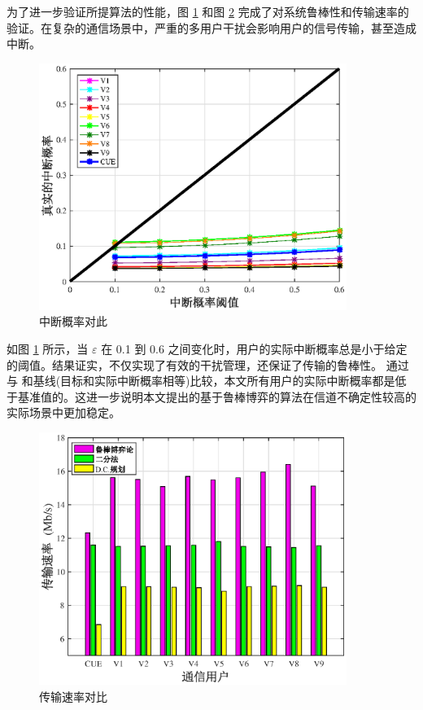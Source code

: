 为了进一步验证所提算法的性能，图 \ref{中断概率对此} 和图 \ref{传输速率对比} 完成了对系统鲁棒性和传输速率的验证。在复杂的通信场景中，严重的多用户干扰会影响用户的信号传输，甚至造成中断。
\begin{figure}[H]
\centering
\includegraphics[width=10cm]{figures//chap2//中断概率.eps}
\caption{中断概率对此}
\label{中断概率对此}
\end{figure}

如图 \ref{中断概率对此} 所示，当 $\varepsilon$ 在 0.1 到 0.6 之间变化时，用户的实际中断概率总是小于给定的阈值。结果证实，不仅实现了有效的干扰管理，还保证了传输的鲁棒性。
通过与 \cite{PCID}和基线(目标和实际中断概率相等)比较，本文所有用户的实际中断概率都是低于基准值的。这进一步说明本文提出的基于鲁棒博弈的算法在信道不确定性较高的实际场景中更加稳定。
\begin{figure}[H]
\centering
\includegraphics[width=10cm]{figures//chap2//传输速率对比.eps}
\caption{传输速率对比}
\label{传输速率对比}
\end{figure}


